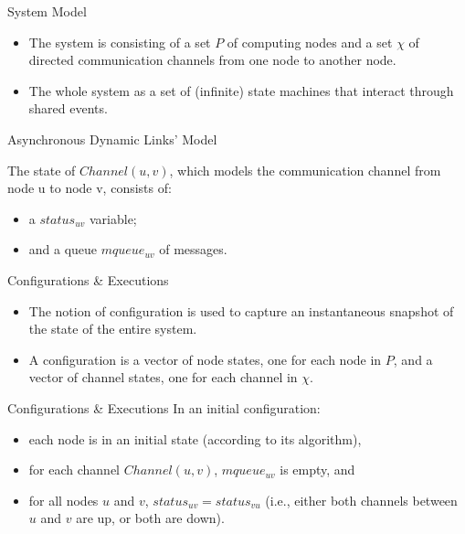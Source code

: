 \documentclass{beamer}
\begin{document}
\begin{frame}{System Model}

\begin{itemize}
	\item The system is consisting of a set $P$ of computing nodes and a set $\chi$ of directed communication channels from one node to another node.
	\item The whole system as a set of (infinite) state machines that interact through shared events.
	
\end{itemize}

\end{frame}
\begin{frame}{Asynchronous Dynamic Links' Model}

	The state of $Channel(u, v)$, which models the communication channel from node u to node v, consists of:
	\begin{itemize}
		\item a $status_{uv}$ variable;
		\item and a queue $mqueue_{uv}$ of messages.
	\end{itemize}
	 

\end{frame}

\begin{frame}{Configurations \& Executions}

\begin{itemize}
	\item The notion of configuration is used to capture an instantaneous snapshot of the state of the entire system.
	\item A configuration is a vector of node states, one for each node in $P$, and a vector of channel states, one for each channel in $\chi$.
\end{itemize}

\end{frame}

\begin{frame}{Configurations \& Executions}
In an initial configuration:
\begin{itemize}
	\item each node is in an initial state (according to its algorithm), \item for each channel $Channel(u, v)$, $mqueue_{uv}$ is empty, and \item for all nodes $u$ and $v$, $status_{uv} = status_{vu}$ (i.e., either both channels between $u$ and $v$ are up, or both are down).
\end{itemize}
\end{frame}
\end{document}
